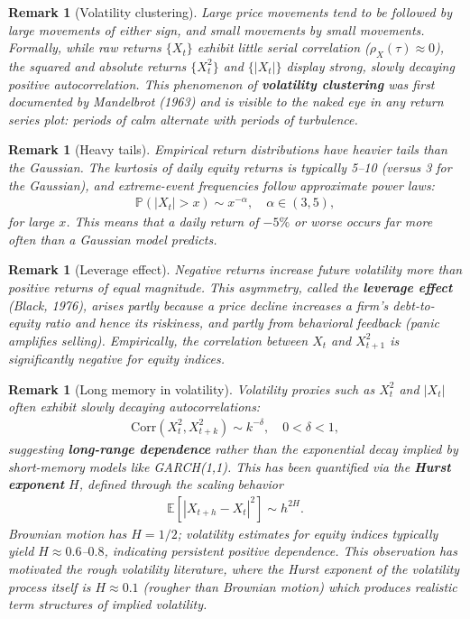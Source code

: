 \documentclass{report}
\theoremstyle{spacedplain}
\theoremstyle{spaceddefinition}
\theoremstyle{spacedremark}
\newtheorem{remark}[theorem]{Remark}
\begin{document}
\begin{remark}[Volatility clustering]
Large price movements tend to be followed by large movements of either sign, and small movements by small movements. Formally, while raw returns $\{X_t\}$ exhibit little serial correlation ($\rho_X(\tau) \approx 0$), the squared and absolute returns $\{X_t^2\}$ and $\{|X_t|\}$ display strong, slowly decaying positive autocorrelation. This phenomenon of \textbf{volatility clustering} was first documented by Mandelbrot (1963) and is visible to the naked eye in any return series plot: periods of calm alternate with periods of turbulence.
\end{remark}

\begin{remark}[Heavy tails]
Empirical return distributions have heavier tails than the Gaussian. The kurtosis of daily equity returns is typically 5--10 (versus 3 for the Gaussian), and extreme-event frequencies follow approximate power laws:
\begin{align}
    \mathbb{P}(|X_t| > x) \sim x^{-\alpha}, \quad \alpha \in (3,5),
\end{align}
for large $x$. This means that a daily return of $-5\%$ or worse occurs far more often than a Gaussian model predicts.
\end{remark}

\begin{remark}[Leverage effect]
Negative returns increase future volatility more than positive returns of equal magnitude. This asymmetry, called the \textbf{leverage effect} (Black, 1976), arises partly because a price decline increases a firm's debt-to-equity ratio and hence its riskiness, and partly from behavioral feedback (panic amplifies selling). Empirically, the correlation between $X_t$ and $X_{t+1}^2$ is significantly negative for equity indices.
\end{remark}

\begin{remark}[Long memory in volatility]
Volatility proxies such as $X_t^2$ and $|X_t|$ often exhibit slowly decaying autocorrelations:
\begin{align}
    \text{Corr}(X_t^2, X_{t+k}^2) \sim k^{-\delta}, \quad 0 < \delta < 1,
\end{align}
suggesting \textbf{long-range dependence} rather than the exponential decay implied by short-memory models like GARCH(1,1). This has been quantified via the \textbf{Hurst exponent} $H$, defined through the scaling behavior
\begin{align}
    \mathbb{E}[|X_{t+h} - X_t|^2] \sim h^{2H}.
\end{align}
Brownian motion has $H = 1/2$; volatility estimates for equity indices typically yield $H \approx 0.6$--$0.8$, indicating persistent positive dependence. This observation has motivated the rough volatility literature, where the Hurst exponent of the volatility process itself is $H \approx 0.1$ (\emph{rougher} than Brownian motion) which produces realistic term structures of implied volatility.
\end{remark}
\end{document}
